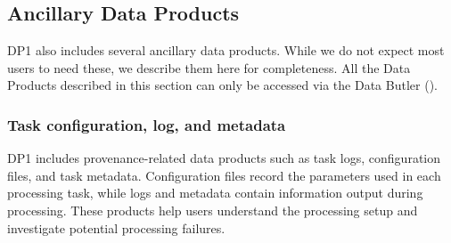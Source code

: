 



\subsection{Ancillary Data Products
\label{subsec:ancilliary}}
DP1 also includes several ancillary data products. While we do not expect most users to need these, we describe them here for completeness. All the Data Products described in this section can only be accessed via the Data Butler ().

\subsubsection{Task configuration, log, and metadata}
\gls{DP1} includes \gls{provenance}-related data products such as task logs, \gls{configuration} files, and task metadata.
Configuration files record the parameters used in each processing task, while logs and \gls{metadata} contain information output during processing. These products help users understand the processing setup and investigate potential processing failures.


